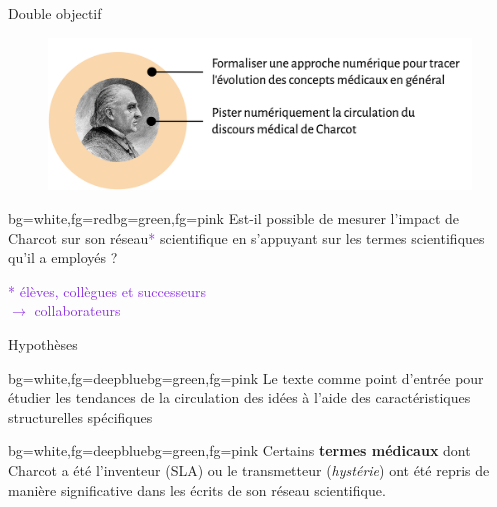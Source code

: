 \begin{frame}{Double objectif}
	\begin{figure}
		\centering
		\includegraphics[width=1\textwidth]{pic/objectif_double.png}
	\end{figure}
	
	\begin{variableblock}{}{bg=white,fg=red}{bg=green,fg=pink}
		\centering
		Est-il possible de mesurer l'impact de Charcot sur son réseau\textcolor{BlueViolet}{*} scientifique en s'appuyant sur les termes scientifiques qu'il a employés ?
	\end{variableblock}
	\begin{flushright}
		{\footnotesize\textcolor{BlueViolet}{* élèves, collègues et successeurs\\
				$\rightarrow$ collaborateurs}}
	\end{flushright}
	
	
\end{frame}

\begin{frame}{Hypothèses}


	\begin{variableblock}{}{bg=white,fg=deepblue}{bg=green,fg=pink}
		\justifying
	Le texte comme point d’entrée pour étudier les tendances de la circulation des idées à l'aide des caractéristiques structurelles spécifiques \\\raggedleft\textcolor{deepred}{\citep{milia2023}}
\end{variableblock}

		\begin{variableblock}{}{bg=white,fg=deepblue}{bg=green,fg=pink}
	\justifying
	Certains \textbf{termes médicaux} dont Charcot a été l’inventeur (\textsc{SLA}) ou le transmetteur (\textit{hystérie}) ont été repris de manière significative dans les écrits de son réseau scientifique.
\end{variableblock}
\end{frame}

